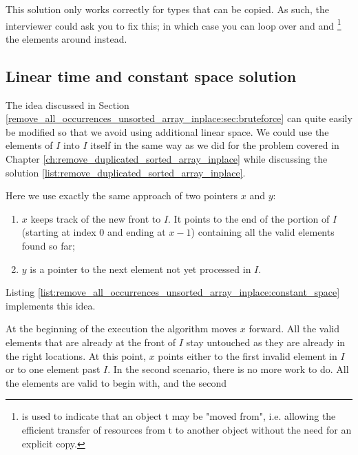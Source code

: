 This solution only works correctly for types that can be copied. As such, the interviewer could
 ask you to fix this; in which case you can loop over 
 and 
 and
\href{https://en.cppreference.com/w/cpp/utility/move}{
}\footnote{
 is used to indicate that an object t may be "moved from", i.e. allowing the efficient transfer of resources from t to another object without the need for an explicit copy.}
 the elements around instead.



\subsection{Linear time and constant space solution}
\label{remove_all_occurrences_unsorted_array_inplace:sec:constant_space}

The idea discussed in Section \ref{remove_all_occurrences_unsorted_array_inplace:sec:bruteforce} can quite easily be modified so that we avoid using additional linear
space. We could use  the elements of $I$ into $I$ itself in the same way as we did for the problem covered in Chapter \ref{ch:remove_duplicated_sorted_array_inplace}
while discussing the solution \ref{list:remove_duplicated_sorted_array_inplace}. 

Here we use exactly the same approach of two pointers $x$ and $y$:
\begin{enumerate}
	\item  $x$ keeps track of the new front to $I$. It points to the end of the portion of $I$ (starting at index $0$ and ending at $x-1$) containing all the valid elements found so far;
	\item $y$ is a pointer to the next element not yet processed in $I$.
\end{enumerate}

Listing \ref{list:remove_all_occurrences_unsorted_array_inplace:constant_space} implements this idea.





At the beginning of the execution the algorithm moves $x$ forward. All the valid elements that are already
at the front of $I$ stay untouched as they are already in the right locations.
At this point, $x$ points either to the first invalid element in $I$ or to one element past $I$.
In the second scenario, there is no more work to do. All the elements are valid to begin with, and the second 

